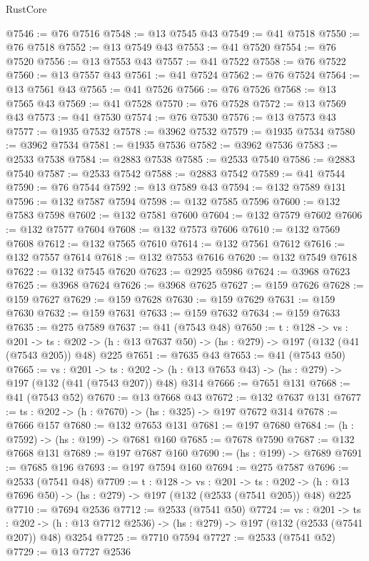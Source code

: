 \begin{lexlean}{RustCore}
\begin{coremodule}
@7546 := @76 @7516
@7548 := @13 @7545 @43
@7549 := @41 @7518
@7550 := @76 @7518
@7552 := @13 @7549 @43
@7553 := @41 @7520
@7554 := @76 @7520
@7556 := @13 @7553 @43
@7557 := @41 @7522
@7558 := @76 @7522
@7560 := @13 @7557 @43
@7561 := @41 @7524
@7562 := @76 @7524
@7564 := @13 @7561 @43
@7565 := @41 @7526
@7566 := @76 @7526
@7568 := @13 @7565 @43
@7569 := @41 @7528
@7570 := @76 @7528
@7572 := @13 @7569 @43
@7573 := @41 @7530
@7574 := @76 @7530
@7576 := @13 @7573 @43
@7577 := @1935 @7532
@7578 := @3962 @7532
@7579 := @1935 @7534
@7580 := @3962 @7534
@7581 := @1935 @7536
@7582 := @3962 @7536
@7583 := @2533 @7538
@7584 := @2883 @7538
@7585 := @2533 @7540
@7586 := @2883 @7540
@7587 := @2533 @7542
@7588 := @2883 @7542
@7589 := @41 @7544
@7590 := @76 @7544
@7592 := @13 @7589 @43
@7594 := @132 @7589 @131
@7596 := @132 @7587 @7594
@7598 := @132 @7585 @7596
@7600 := @132 @7583 @7598
@7602 := @132 @7581 @7600
@7604 := @132 @7579 @7602
@7606 := @132 @7577 @7604
@7608 := @132 @7573 @7606
@7610 := @132 @7569 @7608
@7612 := @132 @7565 @7610
@7614 := @132 @7561 @7612
@7616 := @132 @7557 @7614
@7618 := @132 @7553 @7616
@7620 := @132 @7549 @7618
@7622 := @132 @7545 @7620
@7623 := @2925 @5986
@7624 := @3968 @7623
@7625 := @3968 @7624
@7626 := @3968 @7625
@7627 := @159 @7626
@7628 := @159 @7627
@7629 := @159 @7628
@7630 := @159 @7629
@7631 := @159 @7630
@7632 := @159 @7631
@7633 := @159 @7632
@7634 := @159 @7633
@7635 := @275 @7589
@7637 := @41 (@7543 @48)
@7650 := {t : @128} ->
  {vs : @201} ->
  {ts : @202} -> (h : @13 @7637 @50) -> (hs : @279) -> @197 (@132 (@41 (@7543 @205)) @48) @225
@7651 := @7635 @43
@7653 := @41 (@7543 @50)
@7665 := {vs : @201} ->
  {ts : @202} -> (h : @13 @7653 @43) -> (hs : @279) -> @197 (@132 (@41 (@7543 @207)) @48) @314
@7666 := @7651 @131
@7668 := @41 (@7543 @52)
@7670 := @13 @7668 @43
@7672 := @132 @7637 @131
@7677 := {ts : @202} -> (h : @7670) -> (hs : @325) -> @197 @7672 @314
@7678 := @7666 @157
@7680 := @132 @7653 @131
@7681 := @197 @7680
@7684 := (h : @7592) -> (hs : @199) -> @7681 @160
@7685 := @7678 @7590
@7687 := @132 @7668 @131
@7689 := @197 @7687 @160
@7690 := (hs : @199) -> @7689
@7691 := @7685 @196
@7693 := @197 @7594 @160
@7694 := @275 @7587
@7696 := @2533 (@7541 @48)
@7709 := {t : @128} ->
  {vs : @201} ->
  {ts : @202} -> (h : @13 @7696 @50) -> (hs : @279) -> @197 (@132 (@2533 (@7541 @205)) @48) @225
@7710 := @7694 @2536
@7712 := @2533 (@7541 @50)
@7724 := {vs : @201} ->
  {ts : @202} -> (h : @13 @7712 @2536) -> (hs : @279) -> @197 (@132 (@2533 (@7541 @207)) @48) @3254
@7725 := @7710 @7594
@7727 := @2533 (@7541 @52)
@7729 := @13 @7727 @2536

\end{coremodule}
\end{lexlean}
